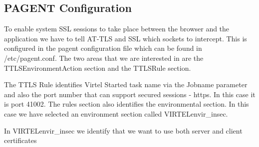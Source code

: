 \documentclass[letterpaper,10pt,english]{sphinxmanual}
\begin{document}
\subsection{PAGENT Configuration}
\label{\detokenize{TN202002:pagent-configuration}}
To enable system SSL sessions to take place between the browser and the application we have to tell AT-TLS and SSL which sockets to intercept. This is configured in the pagent configuration file which can be found in /etc/pagent.conf. The two areas that we are interested in are the TTLSEnvironmentAction section and the TTLSRule section.

\begin{sphinxVerbatim}[commandchars=\\\{\}]
 
    
    
       
       
       
       
       
    
 
    
    
    
    
    
\end{sphinxVerbatim}

The TTLS Rule identifies Virtel Started task name via the Jobname parameter and also the port number that can support secured sessions - https. In this case it is port 41002.
The rules section also identifies the environmental section. In this case we have selected an environment section called VIRTELenvir\_insec.

In VIRTELenvir\_insec we identify that we want to use both server and client certificates

\begin{sphinxVerbatim}[commandchars=\\\{\}]
 
\end{sphinxVerbatim}
\end{document}
